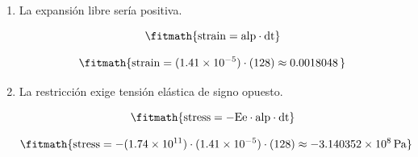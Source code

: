 \begin{enumerate}

\item La expansión libre sería positiva.

\[\fitmath{\mathrm{strain}=\mathrm{alp}\cdot \mathrm{dt}}\]

\[\fitmath{\mathrm{strain}=(1.41\times10^{-5})\cdot (128)\approx 0.0018048\,}\]

\item La restricción exige tensión elástica de signo opuesto.

\[\fitmath{\mathrm{stress}=-\mathrm{Ee}\cdot \mathrm{alp}\cdot \mathrm{dt}}\]

\[\fitmath{\mathrm{stress}=-(1.74\times10^{11})\cdot (1.41\times10^{-5})\cdot (128)\approx -3.140352\times10^{8}\,\mathrm{Pa}}\]

\end{enumerate}
